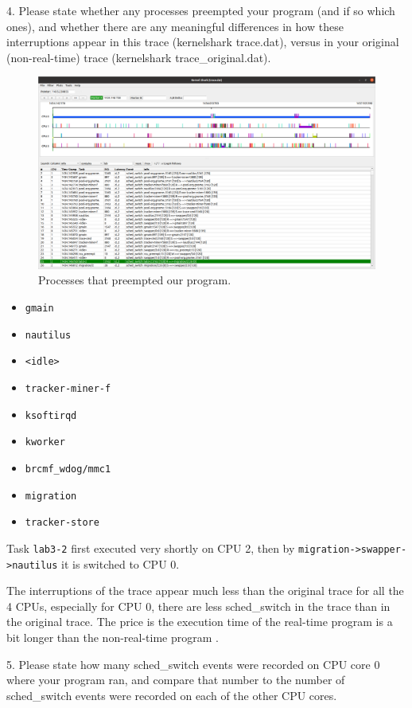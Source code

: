 \documentclass[a4paper]{article}
\begin{document}
4. Please state whether any processes preempted your program (and if so which ones), and whether there are any meaningful differences in how these interruptions appear in this trace (kernelshark trace.dat), versus in your original (non-real-time) trace (kernelshark trace\_original.dat).
\begin{figure}[H]
    \centering
    \includegraphics[width=1\textwidth]{6.png}
    \caption{Processes that preempted our program.}
\end{figure}
\begin{itemize}
    \item \texttt{gmain}
    \item \texttt{nautilus}
    \item \texttt{<idle>}
    \item \texttt{tracker-miner-f}
    \item \texttt{ksoftirqd}
    \item \texttt{kworker}
    \item \texttt{brcmf\_wdog/mmc1}
    \item \texttt{migration}
    \item \texttt{tracker-store}
\end{itemize}
Task \texttt{lab3-2} first executed very shortly on CPU 2, then by \texttt{migration->swapper->nautilus} it is switched to CPU 0.

The interruptions of the trace appear much less than the original trace for all the 4 CPUs, especially for CPU 0, there are less sched\_switch in the trace than in the original trace. The price is the execution time of the real-time program is a bit longer than the non-real-time program \cite{mckenney2008real}.

5. Please state how many sched\_switch events were recorded on CPU core 0 where your program ran, and compare that number to the number of sched\_switch events were recorded on each of the other CPU cores.
\end{document}
